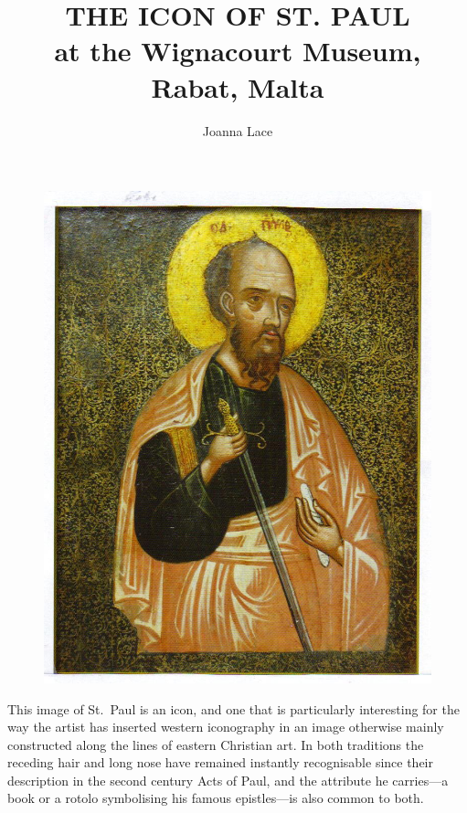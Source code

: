 \documentclass[a4paper,12pt]{article}
\begin{document}
\title{THE ICON OF ST. PAUL\\ at the Wignacourt Museum, Rabat, Malta}
\author{Joanna Lace} 
\date{}%
\maketitle 

\begin{figure}[htbp]
\centering
\includegraphics[width=12cm]{IconStPaul.png}
\caption 
{\it } 
\end{figure}
This image of St.~Paul is an icon, and one that is particularly
interesting for the way the artist has inserted western iconography in
an image otherwise mainly constructed along the lines of eastern
Christian art.  In both traditions the receding hair and long nose
have remained instantly recognisable since their description in the
second century Acts of Paul, and the attribute he carries---a book or
a rotolo symbolising his famous epistles---is also common to both.
\end{document}

